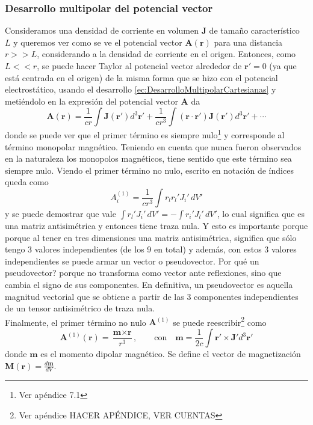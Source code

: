 

\subsubsection{Desarrollo multipolar del potencial vector}
Consideramos una densidad de corriente en volumen $\textbf{J}$ de tamaño característico $L$ y queremos ver como se ve el potencial vector $\textbf{A}(\textbf{r})$ para una distancia $r >> L$, considerando a la densidad de corriente en el origen. Entonces, como $L<<r$, se puede hacer Taylor al potencial vector alrededor de $\textbf{r}' = 0$ (ya que está centrada en el origen) de la misma forma que se hizo con el potencial electrostático, usando el desarrollo \eqref{ec:DesarrolloMultipolarCartesianas} y metiéndolo en la expresión del potencial vector $\textbf{A}$ da
\begin{equation*}
    \textbf{A}(\textbf{r}) =
    \frac{1}{cr}\int \textbf{J}(\textbf{r}')d^{3}\textbf{r}'
    +
    \frac{1}{cr^{3}}\int (\textbf{r}\cdot \textbf{r}') \textbf{J}(\textbf{r}')d^{3}\textbf{r}'
    +
    \cdots
\end{equation*}
donde se puede ver que el primer término es siempre nulo\footnote{Ver apéndice 7.1} y corresponde al término monopolar magnético. Teniendo en cuenta que nunca fueron observados en la naturaleza los monopolos magnéticos, tiene sentido que este término sea siempre nulo. Viendo el primer término no nulo, escrito en notación de índices queda como
\begin{equation*}
    A_{i}^{(1)} = \frac{1}{cr^{3}}\int r_{l}r_{l}'J_{i}'\,dV'
\end{equation*}
y se puede demostrar que vale $\int r_{l}'J_{i}'\,dV' = -\int r_{i}'J_{l}'\,dV'$, lo cual significa que es una matriz antisimétrica y entonces tiene traza nula. Y esto es importante porque porque al tener en tres dimensiones una matriz antisimétrica, significa que sólo tengo 3 valores independientes (de los 9 en total) y además, con estos 3 valores independientes se puede armar un vector o pseudovector. Por qué un pseudovector? porque no transforma como vector ante reflexiones, sino que cambia el signo de sus componentes. En definitiva, un pseudovector es aquella magnitud vectorial que se obtiene a partir de las 3 componentes independientes de un tensor antisimétrico de traza nula.\\
\indent Finalmente, el primer término no nulo $\textbf{A}^{(1)}$ se puede reescribir\footnote{Ver apéndice HACER APÉNDICE, VER CUENTAS} como
\begin{equation*}
    \textbf{A}^{(1)}(\textbf{r}) = 
    \frac{\textbf{m}\times \textbf{r}}{r^{3}},
    \quad
    \quad
    \mbox{con}
    \quad
    \textbf{m} 
    = \frac{1}{2c}\int \textbf{r}'\times \textbf{J}'d^{3}\textbf{r}'
\end{equation*}
donde $\textbf{m}$ es el momento dipolar magnético. Se define el vector de magnetización $\textbf{M}(\textbf{r}) = \frac{d\textbf{m}}{dV}$.

